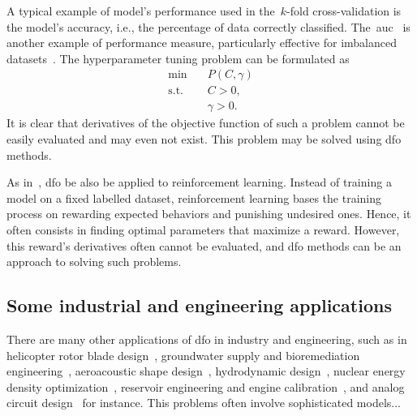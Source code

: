 A typical example of model's performance used in the~$k$-fold cross-validation is the model's accuracy, i.e., the percentage of data correctly classified.
The~\gls{auc}~\cite{Hanley_Mcneil_1982} is another example of performance measure, particularly effective for imbalanced datasets~\cite{Bradley_1997}.
The hyperparameter tuning problem can be formulated as
\begin{equation*}
    \begin{aligned}
        \min        & \quad P(C, \gamma)\\
        \text{s.t.} & \quad C > 0,\\
                    & \quad \gamma > 0.
    \end{aligned}
\end{equation*}
It is clear that derivatives of the objective function of such a problem cannot be easily evaluated and may even not exist.
This problem may be solved using \gls{dfo} methods.

As in~\cite{Qian_Yu_2021}, \gls{dfo} be also be applied to reinforcement learning.
Instead of training a model on a fixed labelled dataset, reinforcement learning bases the training process on rewarding expected behaviors and punishing undesired ones.
Hence, it often consists in finding optimal parameters that maximize a reward.
However, this reward's derivatives often cannot be evaluated, and \gls{dfo} methods can be an approach to solving such problems.

\subsection{Some industrial and engineering applications}




There are many other applications of \gls{dfo} in industry and engineering, such as in helicopter rotor blade design~\cite{Booker_Etal_1998a,Booker_Etal_1998b,Serafini_1998}, groundwater supply and bioremediation engineering~\cite{Fowler_Etal_2008,Mugunthan_Shoemaker_Regis_2005,Yoon_Shoemaker_1999}, aeroacoustic shape design~\cite{Marsden_2004,Marsden_Etal_2004}, hydrodynamic design~\cite{Duvigneau_Visonneau_2004}, nuclear energy density optimization~\cite{Kortelainen_Etal_2010}, reservoir engineering and engine calibration~\cite{Langouet_2011}, and analog circuit design~\cite{Latorre_Etal_2019} for instance.
This problems often involve sophisticated models...

